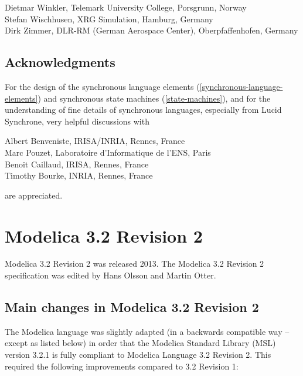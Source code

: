 \documentclass[10pt,a4paper]{report}
\def\doublelabel#1{\label{#1}\hypertarget{#1}{}}
\begin{document}
Dietmar Winkler, Telemark University College, Porsgrunn, Norway\\
Stefan Wischhusen, XRG Simulation, Hamburg, Germany\\
Dirk Zimmer, DLR-RM (German Aerospace Center), Oberpfaffenhofen, Germany

\subsection{Acknowledgments}\doublelabel{acknowledgments1}

For the design of the synchronous language elements (\ref{synchronous-language-elements}) and
synchronous state machines (\ref{state-machines}), and for the understanding of
fine details of synchronous languages, especially from Lucid Synchrone,
very helpful discussions with

Albert Benveniste, IRISA/INRIA, Rennes, France\\
Marc Pouzet, Laboratoire d'Informatique de l'ENS, Paris\\
Benoit Caillaud, IRISA, Rennes, France\\
Timothy Bourke, INRIA, Rennes, France

are appreciated.

\section{Modelica 3.2 Revision 2}\doublelabel{modelica-3-2-revision-2}

Modelica 3.2 Revision 2 was released 2013. The Modelica 3.2 Revision 2
specification was edited by Hans Olsson and Martin Otter.

\subsection{Main changes in Modelica 3.2 Revision 2}\doublelabel{main-changes-in-modelica-3-2-revision-2}

The Modelica language was slightly adapted (in a backwards compatible
way -- except as listed below) in order that the Modelica Standard
Library (MSL) version 3.2.1 is fully compliant to Modelica Language 3.2
Revision 2. This required the following improvements compared to 3.2
Revision 1:
\end{document}
